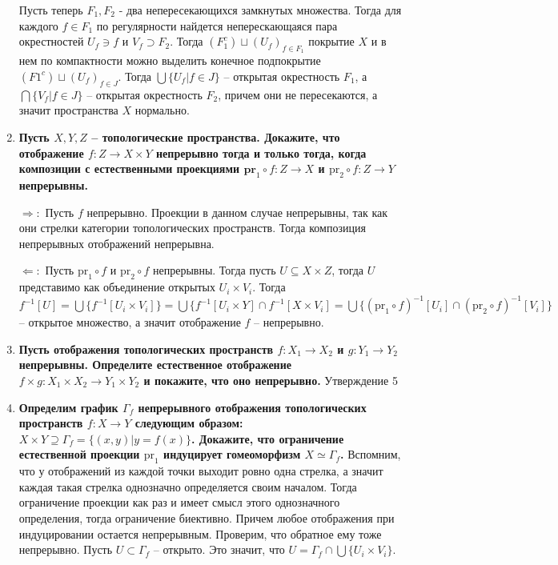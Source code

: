 \documentclass{article}
\begin{document}
\begin{enumerate}
        Пусть теперь $F_1, F_2$ - два непересекающихся замкнутых множества.
        Тогда для каждого $f\in F_1$ по регулярности найдется неперескающаяся
        пара окрестностей $U_f\ni f$ и $V_f\supset F_2$. Тогда $(F_1^c)\sqcup
        (U_f)_{f\in F_1}$ покрытие $X$ и в нем по компактности можно выделить
        конечное подпокрытие $(F1^c)\sqcup (U_f)_{f\in J}$. Тогда $\bigcup\{U_f|
        f\in J\}$ – открытая окрестность $F_1$, а $\bigcap\{V_f|f\in J\}$ –
        открытая окрестность $F_2$, причем они не пересекаются, а значит
        пространства $X$ нормально.
    \item \textbf{Пусть $X,Y,Z$ – топологические пространства. Докажите, что
        отображение $f:Z\longrightarrow X\times Y$ непрерывно тогда и только
        тогда, когда композиции с естественными проекциями $\textbf{pr}_1\circ
        f:Z\longrightarrow X$ и $\text{pr}_2\circ f:Z\longrightarrow Y$
        непрерывны.}\par
        $\Rightarrow:$ Пусть $f$ непрерывно. Проекции в данном случае
        непрерывны, так как они стрелки категории топологических пространств.
        Тогда композиция непрерывных отображений непрерывна.\par
        $\Leftarrow:$ Пусть $\text{pr}_1\circ f$ и $\text{pr}_2\circ f$
        непрерывны. Тогда пусть $U\subseteq X\times Z$, тогда $U$ представимо
        как объединение открытых $U_i\times V_i$. Тогда $f^{-1}[U] = \bigcup\{
        f^{-1}[U_i\times V_i]\}=\bigcup\{f^{-1}[U_i\times Y]\cap f^{-1}[X\times
        V_i]=\bigcup\{(\text{pr}_1\circ f)^{-1}[U_i]\cap(\text{pr}_2\circ f)^
        {-1}[V_i]\}$ – открытое множество, а значит отображение $f$ –
        непрерывно.
    \item \textbf{Пусть отображения топологических пространств $f:X_1
        \longrightarrow X_2$ и $g:Y_1\longrightarrow Y_2$ непрерывны.
        Определите естественное отображение $f\times g:X_1\times X_2
        \longrightarrow Y_1\times Y_2$ и покажите, что оно непрерывно.}
        Утверждение 5
    \item \textbf{Определим график $\Gamma_f$ непрерывного отображения
        топологических пространств $f:X\longrightarrow Y$ следующим образом:
        $X\times Y\supseteq \Gamma_f=\{(x,y)|y=f(x)\}$. Докажите, что
        ограничение естественной проекции $\text{pr}_1$ индуцирует гомеоморфизм
        $X\simeq\Gamma_f$.} Вспомним, что у отображений из каждой точки выходит
        ровно одна стрелка, а значит каждая такая стрелка однозначно
        определяется своим началом. Тогда ограничение проекции как раз и имеет
        смысл этого однозначного определения, тогда ограничение биективно.
        Причем любое отображения при индуцировании остается непрерывным.
        Проверим, что обратное ему тоже непрерывно. Пусть $U\subset\Gamma_f$ –
        открыто. Это значит, что $U=\Gamma_f\cap\bigcup\{U_i\times V_i\}$.
\end{enumerate}
\end{document}
